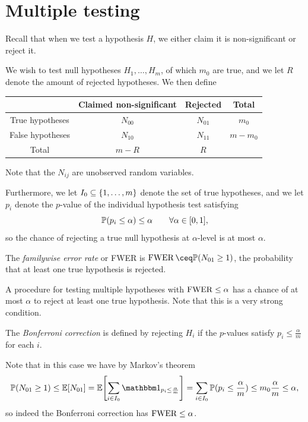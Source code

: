 \section{Multiple testing}
Recall that when we test a hypothesis $H$, we either claim it is non-significant or reject it. 

We wish to test null hypotheses $H_1, \dotsc, H_m$, of which $m_0$ are true,
and we let $R$ denote the amount of rejected hypotheses. We then define
\begin{table}[H]
	\centering
	\begin{tabular}{c || c | c | c}
		& Claimed non-significant & Rejected & Total\\ \hline \hline
		True hypotheses & $N_{00}$ & $N_{01}$ & $m_0$\\ \hline
		False hypotheses & $N_{10}$ & $N_{11}$ & $m - m_0$ \\ \hline
		Total & $m - R$ & $R$
	\end{tabular}
\end{table}
Note that the $N_{ij}$ are unobserved random variables.

Furthermore, we let $I_0 \subseteq \qty{1, \dotsc, m}$ denote the set of true hypotheses, and we let $p_i$ denote the $p$-value of the individual hypothesis test satisfying
\[
\mathbb P(p_i \leq \alpha) \leq \alpha \qquad\forall \alpha \in [0, 1],
\]
so the chance of rejecting a true null hypothesis at $\alpha$-level is at most $\alpha$. 

\begin{definition}
	The \emph{familywise error rate} or FWER is $\FWER \ceq \PP(N_{01} \geq 1)$, the probability that at least one true hypothesis is rejected. 
\end{definition}

A procedure for testing multiple hypotheses with $\operatorname{FWER} \leq\alpha$ has a chance of at most $\alpha$ to reject at least one true hypothesis. Note that this is a very strong condition. 

\begin{example}
	The \emph{Bonferroni correction} is defined by rejecting $H_i$ if the $p$-values satisfy $p_i \leq \frac\alpha m$ for each $i$. 
	
	Note that in this case we have by Markov's theorem
	\[
	\PP(N_{01} \geq 1) \leq \EE[N_{01}] = \EE\qty[\sum_{i \in I_0} \ind_{p_i \leq \frac\alpha m}] = \sum_{i \in I_0} \PP(p_i \leq \frac\alpha m) \leq m_0 \frac\alpha m \leq \alpha, 
	\]
	so indeed the Bonferroni correction has $\operatorname{FWER} \leq \alpha$.
\end{example}


